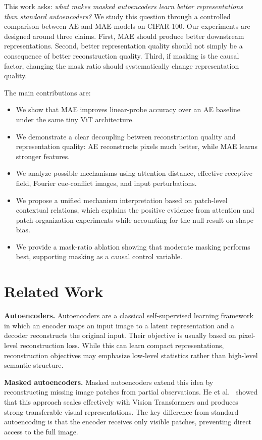 \documentclass[10pt,twocolumn,letterpaper]{article}
\begin{document}
This work asks: \emph{what makes masked autoencoders learn better representations than standard autoencoders?} We study this question through a controlled comparison between AE and MAE models on CIFAR-100. Our experiments are designed around three claims. First, MAE should produce better downstream representations. Second, better representation quality should not simply be a consequence of better reconstruction quality. Third, if masking is the causal factor, changing the mask ratio should systematically change representation quality.

The main contributions are:
\begin{itemize}
    \item We show that MAE improves linear-probe accuracy over an AE baseline under the same tiny ViT architecture.
    \item We demonstrate a clear decoupling between reconstruction quality and representation quality: AE reconstructs pixels much better, while MAE learns stronger features.
    \item We analyze possible mechanisms using attention distance, effective receptive field, Fourier cue-conflict images, and input perturbations.
    \item We propose a unified mechanism interpretation based on patch-level contextual relations, which explains the positive evidence from attention and patch-organization experiments while accounting for the null result on shape bias.
    \item We provide a mask-ratio ablation showing that moderate masking performs best, supporting masking as a causal control variable.
\end{itemize}

\section{Related Work}

\textbf{Autoencoders.}
Autoencoders are a classical self-supervised learning framework in which an encoder maps an input image to a latent representation and a decoder reconstructs the original input. Their objective is usually based on pixel-level reconstruction loss. While this can learn compact representations, reconstruction objectives may emphasize low-level statistics rather than high-level semantic structure.

\textbf{Masked autoencoders.}
Masked autoencoders extend this idea by reconstructing missing image patches from partial observations. He et al.~\cite{he2022mae} showed that this approach scales effectively with Vision Transformers and produces strong transferable visual representations. The key difference from standard autoencoding is that the encoder receives only visible patches, preventing direct access to the full image.
\end{document}
